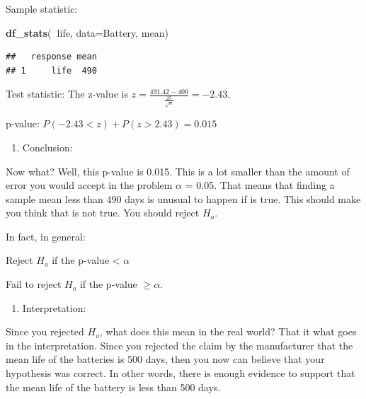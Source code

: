 \documentclass[
]{book}
\newenvironment{Shaded}{\begin{snugshade}}{\end{snugshade}}
\newcommand{\DataTypeTok}[1]{\textcolor[rgb]{0.13,0.29,0.53}{#1}}
\newcommand{\KeywordTok}[1]{\textcolor[rgb]{0.13,0.29,0.53}{\textbf{#1}}}
\newcommand{\NormalTok}[1]{#1}
\newcommand{\OperatorTok}[1]{\textcolor[rgb]{0.81,0.36,0.00}{\textbf{#1}}}
\providecommand{\tightlist}{%
  \setlength{\itemsep}{0pt}\setlength{\parskip}{0pt}}
\begin{document}
Sample statistic:

\begin{Shaded}
\begin{Highlighting}[]
\KeywordTok{df_stats}\NormalTok{(}\OperatorTok{~}\NormalTok{life, }\DataTypeTok{data=}\NormalTok{Battery, mean)}
\end{Highlighting}
\end{Shaded}

\begin{verbatim}
##   response mean
## 1     life  490
\end{verbatim}

Test statistic:
The z-value is \(z=\frac{491.42-400}{\frac{25}{\sqrt{n}}}=-2.43\).

p-value:
\(P(-2.43<z)+P(z>2.43)=0.015\)

\begin{enumerate}
\def\labelenumi{\arabic{enumi}.}
\setcounter{enumi}{4}
\tightlist
\item
  Conclusion:
\end{enumerate}

Now what? Well, this p-value is 0.015. This is a lot smaller than the amount of error you would accept in the problem \(\alpha\) = 0.05. That means that finding a sample mean less than 490 days is unusual to happen if is true. This should make you think that is not true. You should reject \(H_o\).

In fact, in general:

Reject \(H_o\) if the p-value \textless{} \(\alpha\)

Fail to reject \(H_o\) if the p-value \(\ge\alpha\).

\begin{enumerate}
\def\labelenumi{\arabic{enumi}.}
\setcounter{enumi}{5}
\tightlist
\item
  Interpretation:
\end{enumerate}

Since you rejected \(H_o\), what does this mean in the real world? That it what goes in the interpretation. Since you rejected the claim by the manufacturer that the mean life of the batteries is 500 days, then you now can believe that your hypothesis was correct. In other words, there is enough evidence to support that the mean life of the battery is less than 500 days.
\end{document}

